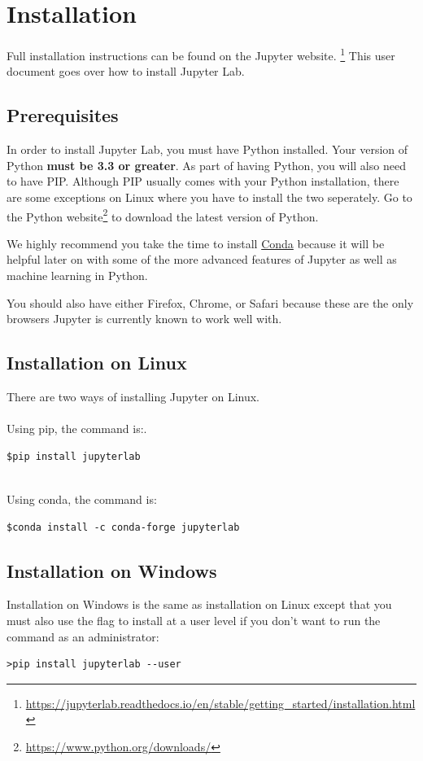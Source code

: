 \documentclass[pdftex,12pt]{artikel3}
\begin{document}
\section{Installation}

Full installation instructions can be found on the Jupyter website. \footnote{\url{ https://jupyterlab.readthedocs.io/en/stable/getting_started/installation.html}} This user document goes over how to install Jupyter Lab.

\subsection{Prerequisites}
In order to install Jupyter Lab, you must have Python installed. Your version of Python \textbf{must be 3.3 or greater}. 
As part of having Python, you will also need to have PIP. Although PIP usually comes with your Python installation, there are some exceptions on Linux where you have to install the two seperately.
Go to the Python website\footnote{\url{ https://www.python.org/downloads/}} to download the latest version of Python.


We highly recommend you take the time to install \href{https://docs.conda.io/projects/conda/en/latest/user-guide/install/}{Conda} because it will be helpful later on with some of the more advanced features of Jupyter as well as machine learning in Python.


You should also have either Firefox, Chrome, or Safari because these are the only browsers Jupyter is currently known to work well with.

\subsection{Installation on Linux}
There are two ways of installing Jupyter on Linux.\\
\\
Using pip, the command is:.\\
\begin{lstlisting}
$pip install jupyterlab
\end{lstlisting}

\\
Using conda, the command is:
\begin{lstlisting}
$conda install -c conda-forge jupyterlab
\end{lstlisting}

\subsection{Installation on Windows}
Installation on Windows is the same as installation on Linux except that you must also use the flag to install at a user level if you don't want to run the command as an administrator:
\begin{lstlisting}
>pip install jupyterlab --user
\end{lstlisting}
\end{document}
